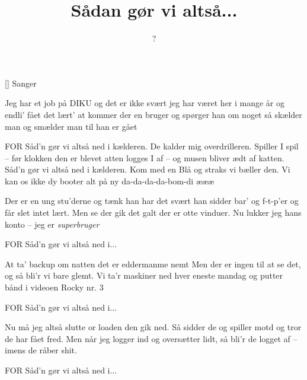 \documentclass[a4paper,11pt]{article}
\title{Sådan gør vi altså...}
\author{?}
\begin{document}
\maketitle

\begin{roles}
[] Sanger
\end{roles}


\begin{song}
%
Jeg har et job på DIKU og det er ikke svært
jeg har været her i mange år og endli' fået det lært'
at kommer der en bruger og spørger han om noget
så skælder man og smælder man til han er gået

FOR Såd'n gør vi altså ned i kælderen.
De kalder mig overdrilleren.
Spiller I spil -- før klokken den er blevet atten
logges I af -- og musen bliver ædt af katten.
Såd'n gør vi altså ned i kælderen.
Kom med en Blå og straks vi bæller den.
Vi kan os ikke dy
booter alt på ny
da-da-da-da-bom-di æææ

Der er en ung stu'derne og tænk han har det svært
han sidder bar' og f-t-p'er og får slet intet lært.
Men se der gik det galt der er otte vinduer.
Nu lukker jeg hans konto -- jeg er \emph{superbruger}

FOR Såd'n gør vi altså ned i...

At ta' backup om natten det er eddermanme nemt
Men der er ingen til at se det, og så bli'r vi bare glemt.
Vi ta'r maskiner ned hver eneste mandag
og putter bånd i videoen Rocky nr. 3

FOR Såd'n gør vi altså ned i...

Nu må jeg altså slutte or loaden den gik ned.
Så sidder de og spiller motd og tror de har fået fred.
Men når jeg logger ind og oversætter lidt,
så bli'r de logget af -- imens de råber shit.

FOR Såd'n gør vi altså ned i...
\end{song}
\end{document}
